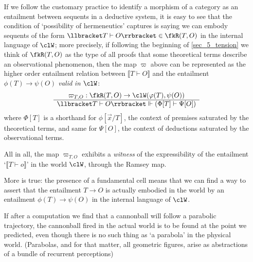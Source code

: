 \begin{remark}\label{herme_explained}
  If we follow the customary practice to identify a morphism of a category as an entailment between sequents in a deductive system, it is easy to see that the condition of `possibility of hermeneutics' captures is saying we can embody sequents of the form $\llbracket T\vdash O\rrbracket \in \fkR(T,O)$ in the internal language of $\clW$; more precisely, if following the beginning of \autoref{sec_5_tension} we think of $\fkR(T,O)$ as the type of all proofs that some theoretical terms describe an observational phenomenon, then the map $\varpi$ above can be represented as the higher order entailment relation between $\llbracket T\vdash O\rrbracket$ and the entailment $\phi(T) \to \psi(O)$ \emph{valid in $\clW$}:
  \[ \begin{array}{c}
      \varpi_{T,O} : \fkR(T,O) \to \clW(\phi(T),\psi(O)) \\ \hline
      \llbracket T\vdash O\rrbracket \Vdash (\Phi[T] \vdash \Psi[O])
    \end{array} \]
  where $\Phi[T]$ is a shorthand for $\phi[\vec x/T]$, the context of premises saturated by the theoretical terms, and same for $\Psi[O]$, the context of deductions saturated by the observational terms.
\end{remark}
All in all, the map $\varpi_{T,O}$ exhibits a \emph{witness} of the expressibility of the entailment `$\llbracket T\vdash o\rrbracket$' in the world $\clW$, through the Ramsey map.

More is true: the presence of a fundamental cell means that we can find a way to assert that the entailment $T\to O$ is actually embodied in the world by an entailment $\phi(T)\to \psi(O)$ in the internal language of $\clW$.

If after a computation we find that a cannonball will follow a parabolic trajectory, the cannonball fired in the actual world is to be found at the point we predicted, even though there is no such thing as `a parabola' in the physical world. (Parabolas, and for that matter, all geometric figures, arise as abstractions of a bundle of recurrent perceptions)

